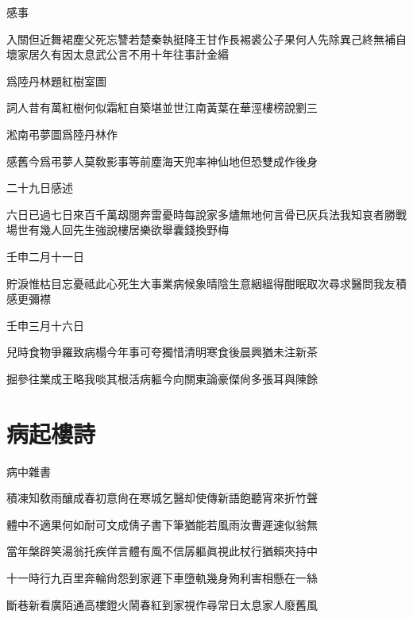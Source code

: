 \documentclass{zhvt-classic-Miya}
\begin{document}
\begin{fw}感事\end{fw}

入關但近舞裙塵父死忘讐若楚秦執挺降王甘作長裼裘公子果何人先除異己終無補自壞家居久有因太息武公言不用十年往事計金緡

\begin{fw}爲陸丹林題紅樹室圖\end{fw}

詞人昔有萬紅樹何似霜紅自築堪並世江南黃葉在華涇樓榜說劉三

\begin{fw}淞南弔夢圖爲陸丹林作\end{fw}

感舊今爲弔夢人莫敎影事等前塵海天兜率神仙地但恐雙成作後身

\begin{fw}二十九日感述\end{fw}

六日已過七日來百千萬刼閱奔雷憂時每說家多燼無地何言骨已灰兵法我知哀者勝戰場世有幾人回先生強說樓居樂欲舉囊錢換野梅

\begin{fw}壬申二月十一日\end{fw}

貯淚惟枯目忘憂祗此心死生大事業病候象晴陰生意絪縕得酣眠取次尋求醫問我友積感更彌襟

\begin{fw}壬申三月十六日\end{fw}

兒時食物爭羅致病榻今年事可夸獨惜清明寒食後晨興猶未注新茶

掘參往業成王略我啖其根活病軀今向關東論豪傑尙多張耳與陳餘

\chapter*{病起樓詩}
\begin{fw}病中雜書\end{fw}

積凍知敎雨釀成春初意尙在寒城乞醫却使傳新語飽聽宵來折竹聲

體中不適果何如耐可文成倩子書下筆猶能若風雨汝曹遲速似翁無

當年槃辟笑湯翁托疾佯言體有風不信孱軀眞視此杖行猶賴夾持中

十一時行九百里奔輪尙怨到家遲下車墮軌幾身殉利害相懸在一絲

斷巷新看廣陌通高樓鐙火鬧春紅到家視作尋常日太息家人廢舊風
\end{document}
